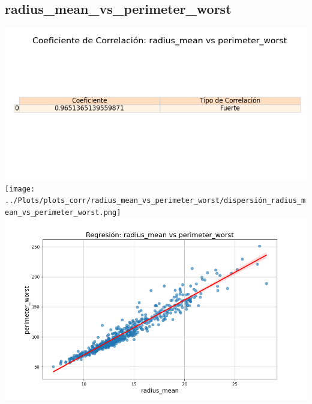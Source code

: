 \documentclass[a4paper, 12pt]{article}
\begin{document}
\subsection{radius\_mean\_vs\_perimeter\_worst}
    \includegraphics[width = \textwidth]{../Plots/plots_corr/radius_mean_vs_perimeter_worst/coeficiente_correlacion_radius_mean_vs_perimeter_worst.png}
    \texttt{[image: ../Plots/plots\_corr/radius\_mean\_vs\_perimeter\_worst/dispersión\_radius\_mean\_vs\_perimeter\_worst.png]}
    \includegraphics[width = \textwidth]{../Plots/plots_corr/radius_mean_vs_perimeter_worst/regresion_radius_mean_vs_perimeter_worst.png}
\end{document}
